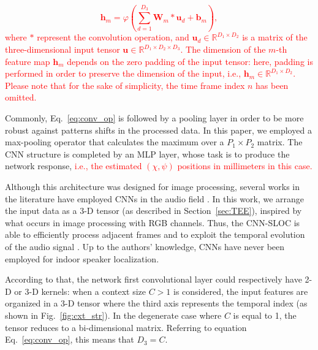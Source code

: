 \documentclass[review]{elsarticle}
\newcommand{\secref}[1]{Section~\ref{#1}}
\newcommand{\figref}[1]{Fig.~\ref{#1}}
\let\originaleqref=\eqref
\renewcommand{\eqref}{Eq.~\originaleqref}
\begin{document}
\textcolor{red}{
\begin{equation}\label{eq:conv_op}
\mathbf{h}_{m}=\varphi	\left(\sum_{d=1}^{D_3} \mathbf{W}_{m} \ast \mathbf{u}_d + \mathbf{b}_{m} \right),
\end{equation}
where $\ast$ represent the convolution operation, and $\mathbf{u}_{d} \in \mathbb{R}^{D_1\times D_2} $ is a matrix of the three-dimensional input tensor $\mathbf{u} \in \mathbb{R}^{D_1\times D_2 \times D_3}$. The dimension of the $m$-th feature map $\mathbf{h}_{m}$ depends on the zero padding of the input tensor: here, padding is performed in order to preserve the dimension of the input, i.e., $\mathbf{h}_{m} \in \mathbb{R}^{D_1\times D_2}$. Please note that for the sake of simplicity, the time frame index $n$ has been omitted.}  %

Commonly, \eqref{eq:conv_op} is followed by a pooling layer in order to be more robust against patterns shifts in the processed data. In this paper, we employed a max-pooling operator that calculates the maximum over a $P_1 \times P_2 $ matrix. The CNN structure is completed by an MLP layer, whose task is to produce the network response, \textcolor{red}{i.e., the estimated $\left ( \chi,\psi \right ) $ positions in millimeters in this case.}

Although this architecture was designed for image processing, several works in the literature have employed CNNs in the audio field \cite{thomas2014analyzing,mcloughlin2015low}. In this work, we arrange the input data as a 3-D tensor (as described in \secref{sec:TEE}), %
inspired by what occurs in image processing with RGB channels. Thus, the CNN-SLOC is able to efficiently process adjacent frames and to exploit the temporal evolution of the audio signal \cite{wirn2016-vad}. Up to the authors' knowledge, CNNs have never been employed for indoor speaker localization. %

According to that, the network first convolutional layer could respectively have 2-D or 3-D kernels: when a context size $C > 1$ is considered, the input features are organized in a 3-D tensor where the third axis represents the temporal index (as shown in \figref{fig:cxt_str}). In the degenerate case where $C$ is equal to 1, the tensor reduces to a bi-dimensional matrix. Referring to equation \eqref{eq:conv_op}, this means that $D_3 = C$.
\end{document}

